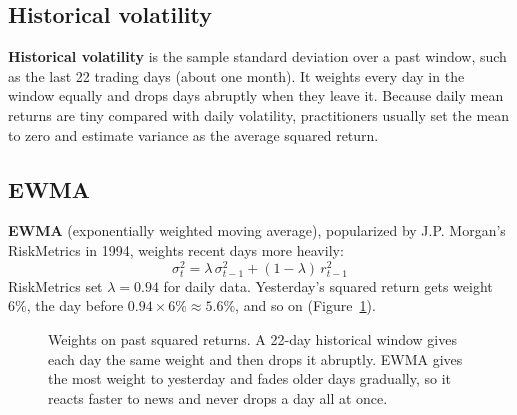 \subsection{Historical volatility}

\textbf{Historical volatility} is the sample standard deviation over a past window, such as the last 22 trading days (about one month). It weights every day in the window equally and drops days abruptly when they leave it. Because daily mean returns are tiny compared with daily volatility, practitioners usually set the mean to zero and estimate variance as the average squared return.

\subsection{EWMA}

\textbf{EWMA} (exponentially weighted moving average), popularized by J.P. Morgan's RiskMetrics in 1994, weights recent days more heavily:
\begin{equation}
  \sigma^2_t = \lambda\,\sigma^2_{t-1} + (1 - \lambda)\,r^2_{t-1}
  \label{eq:14-ewma}
\end{equation}
RiskMetrics set $\lambda = 0.94$ for daily data. Yesterday's squared return gets weight 6\%, the day before $0.94 \times 6\% \approx 5.6\%$, and so on (Figure~\ref{fig:14-ewma}).

\begin{figure}[htbp]
\centering
{}
\caption{Weights on past squared returns. A 22-day historical window gives each day the same weight and then drops it abruptly. EWMA gives the most weight to yesterday and fades older days gradually, so it reacts faster to news and never drops a day all at once.}
\label{fig:14-ewma}
\end{figure}

